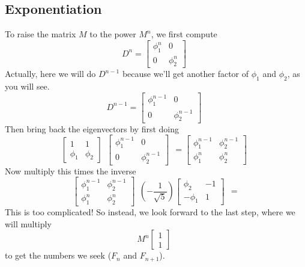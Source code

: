 \documentclass[11pt, oneside]{article}
\begin{document}
\subsection*{Exponentiation}

To raise the matrix $M$ to the power $M^n$, we first compute 
\[ D^n = 
\begin{bmatrix} 
  \phi_1^n  &  0 \\ 
  0  &  \phi_2^n 
\end{bmatrix} \ \ 
\]
Actually, here we will do $D^{n-1}$ because we'll get another factor of $\phi_1$ and $\phi_2$, as you will see.
\[ D^{n-1} = 
\begin{bmatrix} 
  \phi_1^{n-1}  &  0 \\ 
  0  &  \phi_2^{n-1} 
\end{bmatrix} \ \ 
\]
Then bring back the eigenvectors by first doing
\[
\begin{bmatrix} 
  1  &  1 \\ 
  \phi_1  &  \phi_2 
\end{bmatrix} \ \ 
\begin{bmatrix} 
  \phi_1^{n-1}  &  0 \\ 
  0  &  \phi_2^{n-1} 
\end{bmatrix} \ \ 
=
\begin{bmatrix} 
  \phi_1^{n-1}  &  \phi_2^{n-1} \\ 
  \phi_1^n  &  \phi_2^n 
\end{bmatrix} \ \
\]
Now multiply this times the inverse
\[
\begin{bmatrix} 
  \phi_1^{n-1}  &  \phi_2^{n-1} \\ 
  \phi_1^n  &  \phi_2^n 
\end{bmatrix} \ \ 
(-\frac{1}{\sqrt{5}})
\begin{bmatrix} 
  \phi_2  &  -1 \\ 
  -\phi_1  &  1 
\end{bmatrix} \ \ 
=
\]
This is too complicated!  So instead, we look forward to the last step, where we will multiply 
\[ M^n 
\begin{bmatrix} 
   1 \\ 
   1 
\end{bmatrix} \ \
\]
to get the numbers we seek ($F_n$ and $F_{n+1}$).
\end{document}
